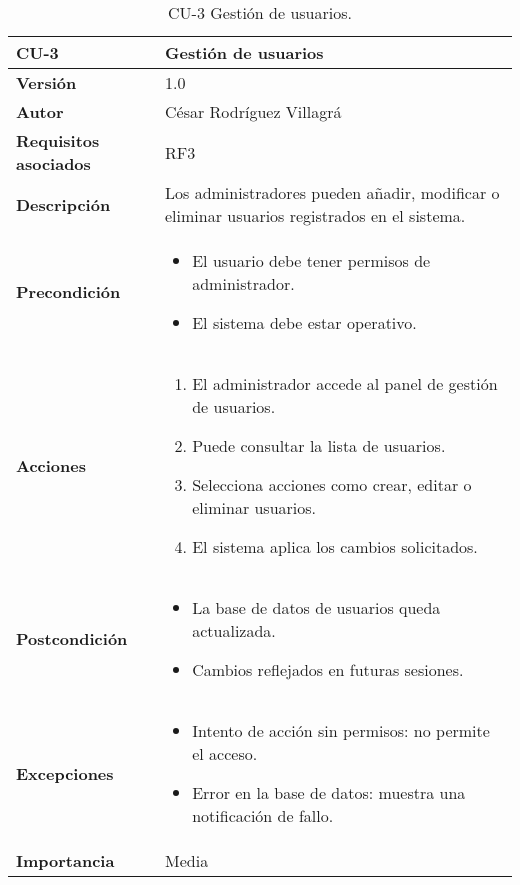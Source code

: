 \begin{table}[p]
	\centering
	\begin{tabularx}{\linewidth}{ p{} p{} }
		\toprule
		\textbf{CU-3}    & \textbf{Gestión de usuarios} \\
		\toprule
		\textbf{Versión}              & 1.0    \\
		\textbf{Autor}                & César Rodríguez Villagrá \\
		\textbf{Requisitos asociados} & RF3 \\
		\textbf{Descripción}          & Los administradores pueden añadir, modificar o eliminar usuarios registrados en el sistema. \\
		\textbf{Precondición}         & 
		\begin{itemize}
			\item El usuario debe tener permisos de administrador.
			\item El sistema debe estar operativo.
		\end{itemize} \\
		\textbf{Acciones}             & 
		\begin{enumerate}
			\item El administrador accede al panel de gestión de usuarios.
			\item Puede consultar la lista de usuarios.
			\item Selecciona acciones como crear, editar o eliminar usuarios.
			\item El sistema aplica los cambios solicitados.
		\end{enumerate} \\
		\textbf{Postcondición}        & 
		\begin{itemize}
			\item La base de datos de usuarios queda actualizada.
			\item Cambios reflejados en futuras sesiones.
		\end{itemize} \\
		\textbf{Excepciones}          & 
		\begin{itemize}
			\item Intento de acción sin permisos: no permite el acceso.
			\item Error en la base de datos: muestra una notificación de fallo.
		\end{itemize} \\
		\textbf{Importancia}          & Media \\
		\bottomrule
	\end{tabularx}
	\caption{CU-3 Gestión de usuarios.}
\end{table}


